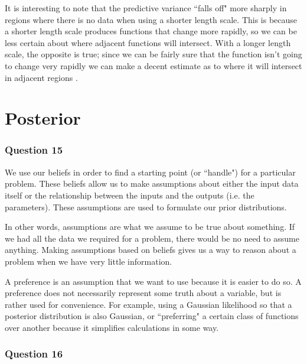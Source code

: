 \documentclass[10pt, a4paper, twocolumn]{article} %
\begin{document}
It is interesting to note that the predictive variance ``falls off" more sharply in regions where there is no data when using a shorter length scale. This is because a shorter length scale produces functions that change more rapidly, so we can be less certain about where adjacent functions will intersect. With a longer length scale, the opposite is true; since we can be fairly sure that the function isn't going to change very rapidly we can make a decent estimate as to where it will intersect in adjacent regions \cite{github1}.




\section{Posterior}

\subsubsection*{Question 15}
We use our beliefs in order to find a starting point (or ``handle") for a particular problem. These beliefs allow us to make assumptions about either the input data itself or the relationship between the inputs and the outputs (i.e. the parameters). These assumptions are used to formulate our prior distributions.

In other words, assumptions are what we assume to be true about something. If we had all the data we required for a problem, there would be no need to assume anything. Making assumptions based on beliefs gives us a way to reason about a problem when we have very little information.

A preference is an assumption that we want to use because it is easier to do so. A preference does not necessarily represent some truth about a variable, but is rather used for convenience. For example, using a Gaussian likelihood so that a posterior distribution is also Gaussian, or ``preferring" a certain class of functions over another because it simplifies calculations in some way.

\subsubsection*{Question 16}
\end{document}
